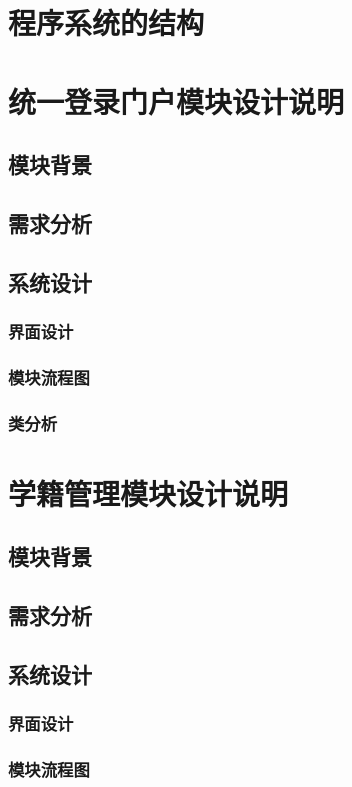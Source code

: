 \documentclass{article}
\begin{document}
\section{程序系统的结构}


\section{统一登录门户模块设计说明}
\subsection{模块背景}
\subsection{需求分析}
\subsection{系统设计}
\subsubsection{界面设计}
\subsubsection{模块流程图}
\subsubsection{类分析}


\section{学籍管理模块设计说明}
\subsection{模块背景}
\subsection{需求分析}
\subsection{系统设计}
\subsubsection{界面设计}
\subsubsection{模块流程图}
\end{document}
